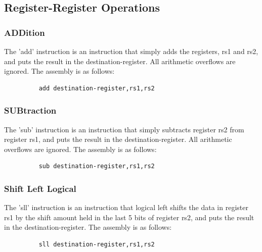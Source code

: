 \documentclass{article}
\begin{document}
\subsection{Register-Register Operations}

\subsubsection{ADDition}
\qquad
The 'add' instruction is an instruction that simply adds the registers, rs1 and rs2, and puts the result in the destination-register. All arithmetic overflows are ignored. The assembly is as follows:
\begin{figure}[!htbp]
    \centering
    \begin{verbatim}
    add destination-register,rs1,rs2
    \end{verbatim}
\end{figure}\newline

\subsubsection{SUBtraction}
\qquad
The 'sub' instruction is an instruction that simply subtracts register rs2 from register rs1, and puts the result in the destination-register. All arithmetic overflows are ignored. The assembly is as follows:
\begin{figure}[!htbp]
    \centering
    \begin{verbatim}
    sub destination-register,rs1,rs2
    \end{verbatim}
\end{figure}\newline

\subsubsection{Shift Left Logical}
\qquad
The 'sll' instruction is an instruction that logical left shifts the data in register rs1 by the shift amount held in the last 5 bits of register rs2, and puts the result in the destination-register. The assembly is as follows:
\begin{figure}[!htbp]
    \centering
    \begin{verbatim}
    sll destination-register,rs1,rs2
    \end{verbatim}
\end{figure}\newline
\end{document}
